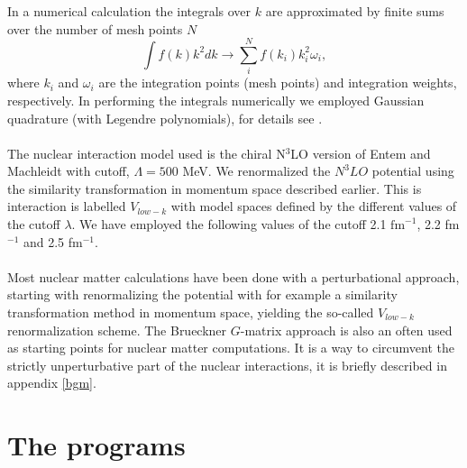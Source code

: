 In a numerical calculation the integrals over $k$ are approximated by finite sums over the number
of mesh points $N$ 
\begin{equation*}
		\int f(k)k^2dk \rightarrow \sum_i^N f(k_i)k^2_i\omega_i,
\end{equation*}
where $k_i$ and $\omega_i$ are the integration points (mesh points) and integration weights, respectively.
In performing the integrals numerically we employed Gaussian quadrature 
(with Legendre polynomials), for details see \cite{compphys-mhjensen}.\\
\\
The nuclear interaction model used is the chiral N$^3$LO version of Entem and Machleidt 
\cite{entem-2003-68} with cutoff, 
$\Lambda=500$ MeV. We
renormalized the $N^3LO$ potential using the similarity transformation in momentum space described earlier. This is interaction is labelled $V_{low-k}$ with model spaces defined by the different values of the cutoff  $\lambda$. We have employed the following values of the cutoff
2.1 $\mbox{fm}^{-1}$, 2.2 fm$^{-1}$ and 2.5 fm$^{-1}$.\\
\\
Most nuclear matter calculations have been done with a
perturbational approach, starting with renormalizing the potential 
with for example a similarity transformation method in momentum space, yielding the so-called  
$V_{low-k}$ 
renormalization scheme. The Brueckner $G$-matrix approach is also an often used as starting points for nuclear matter computations. It is a way to circumvent
the strictly unperturbative part of the nuclear interactions, it is briefly described
in appendix \ref{bgm}.  
\\
\section{The programs}

